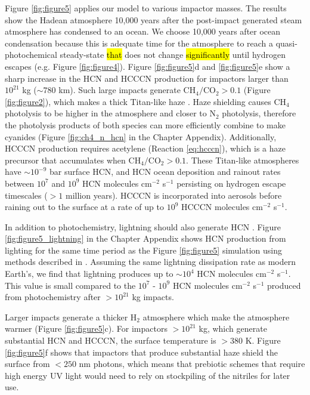 Figure \ref{fig:figure5} applies our model to various impactor masses. The results show the Hadean atmosphere 10,000 years after the post-impact generated steam atmosphere has condensed to an ocean. We choose 10,000 years after ocean condensation because this is adequate time for the atmosphere to reach a quasi-photochemical steady-state \hl{that} does not change \hl{significantly} until hydrogen escapes (e.g. Figure \ref{fig:figure4}). Figure \ref{fig:figure5}d and \ref{fig:figure5}e show a sharp increase in the HCN and HCCCN production for impactors larger than $10^{21}$ kg ($\sim 780$ km). Such large impacts generate $\mathrm{CH_4}/\mathrm{CO_2} > 0.1$ (Figure \ref{fig:figure2}), which makes a thick Titan-like haze \citep{Trainer_2006}. Haze shielding causes CH$_4$ photolysis to be higher in the atmosphere and closer to N$_2$ photolysis, therefore the photolysis products of both species can more efficiently combine to make cyanides (Figure \ref{fig:ch4_n_hcn} in the Chapter Appendix). Additionally, HCCCN production requires acetylene (Reaction \ref{eq:hcccn}), which is a haze precursor that accumulates when $\mathrm{CH_4}/\mathrm{CO_2} > 0.1$. These Titan-like atmospheres have $\sim 10^{-9}$ bar surface HCN, and HCN ocean deposition and rainout rates between $10^7$ and $10^9$ HCN molecules cm$^{-2}$ s$^{-1}$ persisting on hydrogen escape timescales ($> 1$ million years). HCCCN is incorporated into aerosols before raining out to the surface at a rate of up to $10^9$ HCCCN molecules cm$^{-2}$ s$^{-1}$.

In addition to photochemistry, lightning should also generate HCN \citep{Chameides_1981,Stribling_1987}. Figure \ref{fig:figure5_lightning} in the Chapter Appendix shows HCN production from lighting for the same time period as the Figure \ref{fig:figure5} simulation using methods described in \citet{Chameides_1981}. Assuming the same lightning dissipation rate as modern Earth's, we find that lightning produces up to $\sim 10^{4}$ HCN molecules cm$^{-2}$ s$^{-1}$. This value is small compared to the $10^{7}$ - $10^{9}$ HCN molecules cm$^{-2}$ s$^{-1}$ produced from photochemistry after $> 10^{21}$ kg impacts.

Larger impacts generate a thicker H$_2$ atmosphere which make the atmosphere warmer (Figure \ref{fig:figure5}c). For impactors $> 10^{21}$ kg, which generate substantial HCN and HCCCN, the surface temperature is $> 380$ K. Figure \ref{fig:figure5}f shows that impactors that produce substantial haze shield the surface from $< 250$ nm photons, which means that prebiotic schemes that require high energy UV light \citep[e.g.,][]{Patel_2015} would need to rely on stockpiling of the nitriles for later use. 

